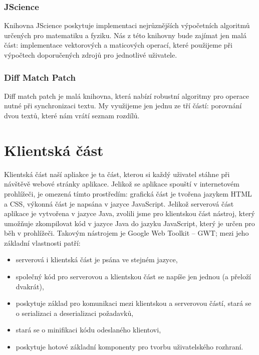 \subsubsection{JScience}
Knihovna JScience poskytuje implementaci nejrůznějších výpočetních algoritmů určených pro matematiku a fyziku.
Nás z této knihovny bude zajímat jen malá část: implementace vektorových a maticových operací, které použijeme při výpočtech doporučených zdrojů pro jednotlivé uživatele.

\subsubsection{Diff Match Patch}
Diff match patch je malá knihovna, která nabízí robustní algoritmy pro operace nutné při synchronizaci textu.
My využijeme jen jednu ze tří částí: porovnání dvou textů, které nám vrátí seznam rozdílů.

\section{Klientská část}

Klientská část naší apliakce je ta část, kterou si každý uživatel stáhne při návštěvě webové stránky aplikace.
Jelikož se aplikace spouští v internetovém prohlížeči, je omezená tímto prostředím: grafická část je tvořena jazykem HTML a CSS, výkonná část je napsána v jazyce JavaScript.
Jelikož serverová část aplikace je vytvořena v jazyce Java, zvolili jsme pro klientskou část nástroj, který umožňuje zkompilovat kód v jazyce Java do jazyku JavaScript, který je určen pro běh v prohlížeči.
Takovým nástrojem je Google Web Toolkit -- GWT; mezi jeho základní vlastnosti patří:
\begin{itemize}
    \item serverová i klientská část je psána ve stejném jazyce,
    \item společný kód pro serverovou a klientskou část se napíše jen jednou (a přeloží dvakrát),
    \item poskytuje základ pro komunikaci mezi klientskou a serverovou částí, stará se o serializaci a deserializaci požadavků,
    \item stará se o minifikaci kódu odeslaného klientovi,
    \item poskytuje hotové základní komponenty pro tvorbu uživatelského rozhraní.
\end{itemize}

